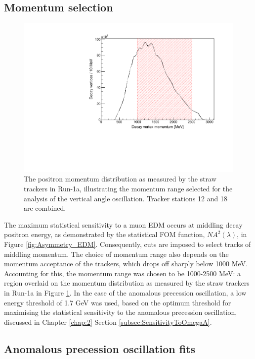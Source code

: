 \subsection{Momentum selection}\label{subsec:MomSelect}

\begin{figure}[b!]
\centering{}
\includegraphics[trim={0 0 0 0},clip,width=.69\textwidth]{Images/Chapter5/RecoMomentum_Simultaneous.pdf}
\caption{The positron momentum distribution as measured by the straw trackers in Run-1a, illustrating the momentum range selected for the analysis of the vertical angle oscillation. Tracker stations 12 and 18 are combined.}
\label{fig:RecoMomentum_Simultaneous}
\end{figure}  

The maximum statistical sensitivity to a muon EDM occurs at middling decay positron energy, as demonstrated by the statistical FOM function, $NA^{2}(\lambda)$, in Figure \ref{fig:Asymmetry_EDM}. Consequently, cuts are imposed to select tracks of middling momentum. The choice of momentum range also depends on the momentum acceptance of the trackers, which drops off sharply below 1000 MeV. Accounting for this, the momentum range was chosen to be 1000-2500 MeV: a region overlaid on the momentum distribution as measured by the straw trackers in Run-1a in Figure \ref{fig:RecoMomentum_Simultaneous}. In the case of the anomalous precession oscillation, a low energy threshold of 1.7 GeV was used, based on the optimum threshold for maximising the statistical sensitivity to the anomalous precession oscillation, discussed in Chapter \ref{chap:2} Section \ref{subsec:SensitivityToOmegaA}.

\subsection{Anomalous precession oscillation fits}

